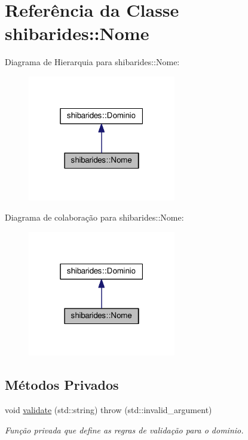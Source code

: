 \hypertarget{classshibarides_1_1Nome}{}\section{Referência da Classe shibarides\+:\+:Nome}
\label{classshibarides_1_1Nome}


Diagrama de Hierarquia para shibarides\+:\+:Nome\+:\nopagebreak
\begin{figure}[H]
\begin{center}
\leavevmode
\includegraphics[width=183pt]{classshibarides_1_1Nome__inherit__graph}
\end{center}
\end{figure}


Diagrama de colaboração para shibarides\+:\+:Nome\+:\nopagebreak
\begin{figure}[H]
\begin{center}
\leavevmode
\includegraphics[width=183pt]{classshibarides_1_1Nome__coll__graph}
\end{center}
\end{figure}
\subsection*{Métodos Privados}
\begin{DoxyCompactItemize}
\item 
void \hyperlink{classshibarides_1_1Nome_aae6c1656422424a675e79a03a7ca534e}{validate} (std\+::string)  throw (std\+::invalid\+\_\+argument)
\begin{DoxyCompactList}\small\item\em Função privada que define as regras de validação para o dominio. \end{DoxyCompactList}\end{DoxyCompactItemize}
